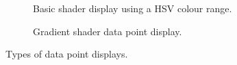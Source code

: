 
\begin{figure}[H]
	\captionsetup[subfigure]{aboveskip=-0.8em,belowskip=0.5em}
	\newcommand{\figurewidth}{0.5\textwidth}
	\begin{subfigure}[b]{\figurewidth}
		\caption{Basic shader display using a HSV colour range.}
		\label{fig:basic_shader}
	\end{subfigure}
	\begin{subfigure}[b]{\figurewidth}
		\caption{Gradient shader data point display.}
		\label{fig:gradient_shader}
	\end{subfigure}
	\caption[Data point display types]{Types of data point displays.}
	\label{fig:data_point_displays}
\end{figure}
